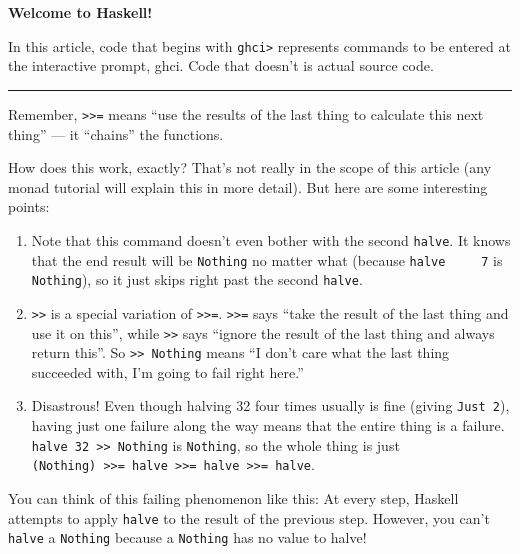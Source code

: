 \documentclass[]{article}
\begin{document}
\textbf{Welcome to Haskell!}

In this article, code that begins with \texttt{ghci\textgreater{}} represents
commands to be entered at the interactive prompt, ghci. Code that doesn't is
actual source code.

\begin{center}\rule{0.5\linewidth}{0.5pt}\end{center}

Remember, \texttt{\textgreater{}\textgreater{}=} means ``use the results of the
last thing to calculate this next thing'' --- it ``chains'' the functions.

How does this work, exactly? That's not really in the scope of this article (any
monad tutorial will explain this in more detail). But here are some interesting
points:

\begin{enumerate}
\def\labelenumi{\arabic{enumi}.}
\tightlist
\item
  Note that this command doesn't even bother with the second \texttt{halve}. It
  knows that the end result will be \texttt{Nothing} no matter what (because
  \texttt{halve\ \ \ \ \ 7} is \texttt{Nothing}), so it just skips right past
  the second \texttt{halve}.
\item
  \texttt{\textgreater{}\textgreater{}} is a special variation of
  \texttt{\textgreater{}\textgreater{}=}. \texttt{\textgreater{}\textgreater{}=}
  says ``take the result of the last thing and use it on this'', while
  \texttt{\textgreater{}\textgreater{}} says ``ignore the result of the last
  thing and always return this''. So
  \texttt{\textgreater{}\textgreater{}\ Nothing} means ``I don't care what the
  last thing succeeded with, I'm going to fail right here.''
\item
  Disastrous! Even though halving 32 four times usually is fine (giving
  \texttt{Just\ 2}), having just one failure along the way means that the entire
  thing is a failure. \texttt{halve\ 32\ \textgreater{}\textgreater{}\ Nothing}
  is \texttt{Nothing}, so the whole thing is just
  \texttt{(Nothing)\ \textgreater{}\textgreater{}=\ halve\ \textgreater{}\textgreater{}=\ halve\ \textgreater{}\textgreater{}=\ halve}.
\end{enumerate}

You can think of this failing phenomenon like this: At every step, Haskell
attempts to apply \texttt{halve} to the result of the previous step. However,
you can't \texttt{halve} a \texttt{Nothing} because a \texttt{Nothing} has no
value to halve!
\end{document}
